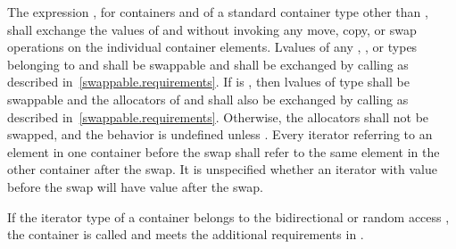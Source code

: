 \pnum
The expression , for containers  and  of a standard
container type other than , shall exchange the values of  and
 without invoking any move, copy, or swap operations on the individual
container elements.
Lvalues of any , , or  types
belonging to  and  shall be swappable
and shall be exchanged by calling 
as described in~\ref{swappable.requirements}. If
 is
, then
lvalues of type  shall be swappable and
the allocators of  and  shall also be exchanged
by calling  as described in~\ref{swappable.requirements}.
Otherwise, the allocators shall not be swapped, and the behavior is
undefined unless . Every iterator
referring to an element in one container before the swap shall refer to the same
element in the other container after the swap. It is unspecified whether an iterator
with value  before the swap will have value  after the
swap.

\pnum
{}%
If the iterator type of a container belongs to the bidirectional or
random access ,
the container is called
and meets the additional requirements
in .

